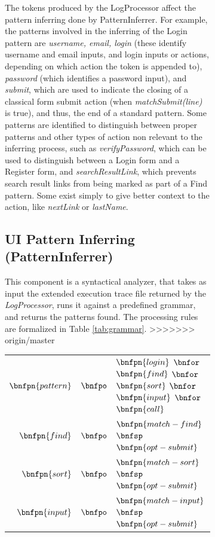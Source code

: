 \documentclass[conference]{IEEEtran}
\begin{document}
\begin{enumerate}
\begin{figure}[!htb]
\begin{itemize}
\begin{figure}[!htb]
\begin{itemize}
The tokens produced by the LogProcessor affect the pattern inferring done by PatternInferrer. For example, the patterns involved in the inferring of the Login pattern are \textit{username, email, login} (these identify username and email inputs, and login inputs or actions, depending on which action the token is appended to), \textit{password} (which identifies a password input),  and \textit{submit}, which are used to indicate the closing of a classical form submit action (when \textit{matchSubmit(line)} is true), and thus, the end of a standard pattern. Some patterns are identified to distinguish between proper patterns and other types of action non relevant to the inferring process, such as \textit{verifyPassword}, which can be used to distinguish between a Login form and a Register form, and \textit{searchResultLink}, which prevents search result links from being marked as part of a Find pattern. Some exist simply to give better context to the action, like \textit{nextLink} or \textit{lastName}.\\

\subsection{UI Pattern Inferring (PatternInferrer)}\label{sec:inf}

This component is a syntactical analyzer, that takes as input the extended execution trace file returned by the \textit{LogProcessor}, runs it against a predefined grammar, and returns the patterns found. The processing rules are formalized in Table \ref{tab:grammar}.
>>>>>>> origin/master

\begin{table}[!htb]
\begin{tabular}{rcl}
  $\bnfpn{pattern}$ & $\bnfpo$ & $\bnfpn{login}$ $\bnfor$ $\bnfpn{find}$ $\bnfor$ $\bnfpn{sort}$ $\bnfor$ $\bnfpn{input}$ $\bnfor$ $\bnfpn{call}$ \\
  
  $\bnfpn{find}$  & $\bnfpo$ &  $\bnfpn{match-find}$ $\bnfsp$ $\bnfpn{opt-submit}$ \\
  
  $\bnfpn{sort}$ & $\bnfpo$ &  $\bnfpn{match-sort}$ $\bnfsp$ $\bnfpn{opt-submit}$ \\
  
  $\bnfpn{input}$ & $\bnfpo$ &  $\bnfpn{match-input}$ $\bnfsp$ $\bnfpn{opt-submit}$ \\
  

\end{tabular}
\end{table}
\end{itemize}
\end{figure}
\end{itemize}
\end{figure}
\end{enumerate}
\end{document}
